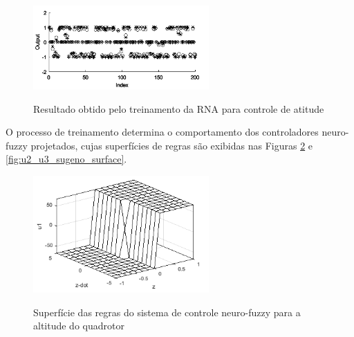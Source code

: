 \begin{figure}[!htb]
    \centering
    \caption{Resultado obtido pelo treinamento da RNA para controle de atitude}
    \includegraphics[width=0.6\textwidth]{./04-figuras/anfisedit/rna_anfis_train_result_atitude}
    \label{fig:rna_anfis_train_result_atitude}
\end{figure}

O processo de treinamento determina o comportamento dos controladores neuro-fuzzy projetados, cujas superfícies de regras são exibidas nas Figuras \ref{fig:u1_sugeno_surface} e \ref{fig:u2_u3_sugeno_surface}.


\begin{figure}[!htb]
    \centering
    \caption{Superfície das regras do sistema de controle neuro-fuzzy para a altitude do quadrotor}
    \includegraphics[width=0.6\textwidth]{./04-figuras/resultados/fis_u1/u1_sugeno_surface}
    \label{fig:u1_sugeno_surface}
\end{figure}

